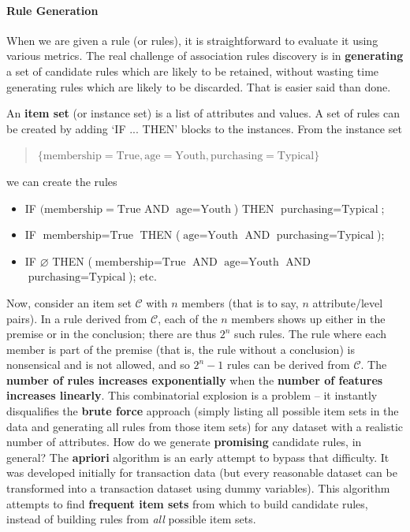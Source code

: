 \paragraph{Rule Generation} When we are given a rule (or rules), it is straightforward to evaluate it using various metrics. The real  challenge of association rules discovery is in \textbf{generating} a set of candidate rules which are likely to be retained, without wasting time generating rules which are likely to be discarded. That is easier said than done.  \par 
An \textbf{item set} (or instance set) is a list of attributes and values. A set of rules can be created by adding `IF ... THEN' blocks to the instances. From the instance set 
\begin{quote}$\{ \textrm{membership} = \textrm{True}, \textrm{age} = \textrm{Youth}, \textrm{purchasing} = \textrm{Typical} \}$ \end{quote}
we can create the rules
\begin{itemize}[noitemsep]
    \item IF $(\textrm{membership} = \textrm{True}$ AND $\textrm{age} = \textrm{Youth}$) THEN $\textrm{purchasing} = \textrm{Typical}$;
    \item IF $\textrm{membership} = \textrm{True}$ THEN ($\textrm{age} = \textrm{Youth}$ AND $\textrm{purchasing} = \textrm{Typical}$);
    \item IF $\varnothing$ THEN ($\textrm{membership} = \textrm{True}$ AND $\textrm{age} = \textrm{Youth}$ AND $\textrm{purchasing} = \textrm{Typical}$); etc.
\end{itemize}
Now, consider an item set $\mathcal{C}$ with $n$ members (that is to say, $n$ attribute/level pairs). In a rule derived from $\mathcal{C}$, each of the $n$ members shows up either in the premise or in the conclusion; there are thus $2^n$ such rules. The rule where each member is part of the premise (that is, the rule without a conclusion) is nonsensical and is not allowed, and so $2^n-1$ rules can be derived from $\mathcal{C}$. The \textbf{number of rules increases exponentially} when the \textbf{number of features increases linearly}. This combinatorial explosion is a problem -- it instantly disqualifies the \textbf{brute force} approach (simply listing all possible item sets in the data and generating all rules from those item sets) for any dataset with a realistic number of attributes. How do we generate \textbf{promising} candidate rules, in general?
\newl The \textbf{apriori} algorithm is an early attempt to bypass that difficulty. It was developed initially for transaction data (but every reasonable dataset can be transformed into a transaction dataset using dummy variables). This algorithm attempts to find \textbf{frequent item sets} from which to build candidate rules, instead of building rules from \textit{all} possible item sets.
